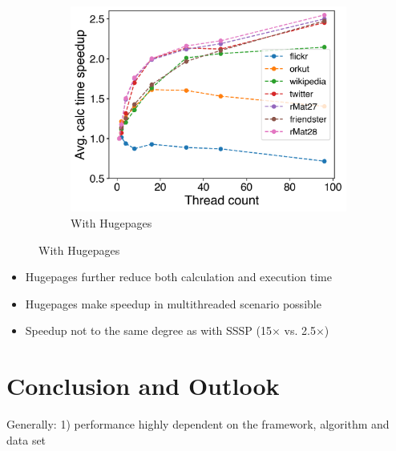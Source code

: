 \documentclass{meetings}
\begin{document}
\begin{figure}[h!]
\begin{subfigure}{0.3\linewidth}
	\centering
\includegraphics[width=\linewidth]{../../plots/singleNodePRPullGaloisHPThreads.png}
		\caption{With Hugepages}
	\end{subfigure}
\end{figure}
\begin{itemize}
	\item Hugepages further reduce both calculation and execution time
	\item Hugepages make speedup in multithreaded scenario possible
	\item Speedup not to the same degree as with SSSP (15$\times$ vs. 2.5$\times$)
\end{itemize}


\restoregeometry



\section{Conclusion and Outlook}
Generally: 1) performance highly dependent on the framework, algorithm and data set
\end{document}
